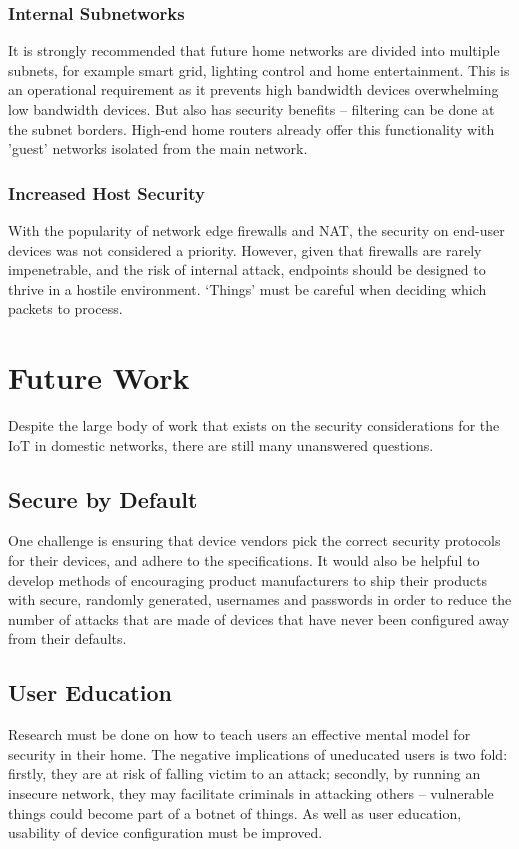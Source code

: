 \documentclass[10pt,journal,compsoc]{IEEEtran}
\begin{document}
\subsubsection{Internal Subnetworks}
It is strongly recommended that future home networks are divided into multiple
subnets, for example smart grid, lighting control and home entertainment. This
is an operational requirement as it prevents high bandwidth devices
overwhelming low bandwidth devices. But also has security benefits -- filtering
can be done at the subnet borders. High-end home routers already offer this
functionality with 'guest' networks isolated from the main network.  

\subsubsection{Increased Host Security}
With the popularity of network edge firewalls and NAT, the security on end-user
devices was not considered a priority. However, given that firewalls are rarely
impenetrable, and the risk of internal attack, endpoints should be designed to
thrive in a hostile environment. `Things' must be careful when deciding which
packets to process.  


\section{Future Work}
Despite the large body of work that exists on the security considerations for
the IoT in domestic networks, there are still many unanswered questions. 

\subsection{Secure by Default}
One challenge is ensuring that device vendors pick the correct security
protocols for their devices, and adhere to the specifications. It would also be
helpful to develop methods of encouraging product manufacturers to ship their
products with secure, randomly generated, usernames and passwords in order to
reduce the number of attacks that are made of devices that have never been
configured away from their defaults.

\subsection{User Education}
Research must be done on how to teach users an effective mental model for
security in their home. The negative implications of uneducated users is two
fold: firstly, they are at risk of falling victim to an attack; secondly, by
running an insecure network, they may facilitate criminals in attacking others
-- vulnerable things could become part of a botnet of things. As well as user
education, usability of device configuration must be improved. 
\end{document}
